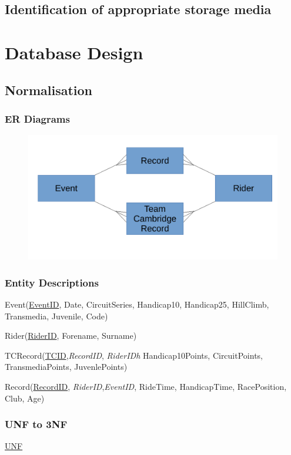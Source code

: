 \subsection{Identification of appropriate storage media}

\section{Database Design}

\subsection{Normalisation}

\subsubsection{ER Diagrams}
\begin{figure}[H]
    \includegraphics[width=\textwidth]{./ER/ERDesing.pdf}
\end{figure}

\subsubsection{Entity Descriptions}
Event(\underline{EventID}, Date, CircuitSeries, Handicap10, Handicap25, HillClimb, Transmedia, Juvenile, Code)

Rider(\underline{RiderID}, Forename, Surname)

TCRecord(\underline{TCID},\emph{RecordID}, \emph{RiderIDh} Handicap10Points, CircuitPoints, TransmediaPoints, JuvenlePoints)

Record(\underline{RecordID}, \emph{RiderID},\emph{EventID}, RideTime, HandicapTime, RacePosition, Club, Age)

\subsubsection{UNF to 3NF}
\underline{UNF}

